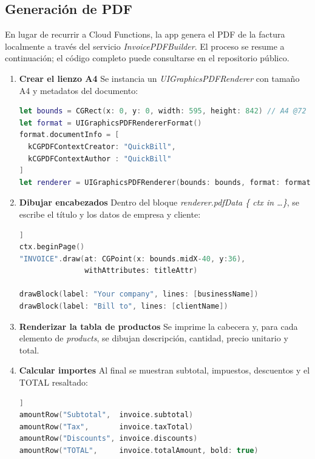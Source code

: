 \subsection{Generación de PDF}

\begin{large}

En lugar de recurrir a Cloud Functions, la app genera el PDF de la factura localmente a través del servicio \textit{InvoicePDFBuilder}. El proceso se resume a continuación; el código completo puede consultarse en el repositorio público.

\begin{enumerate}
  \item \textbf{Crear el lienzo A4}\newline
  Se instancia un \textit{UIGraphicsPDFRenderer} con tamaño A4 y metadatos del documento:
  \begin{lstlisting}[language=swift, basicstyle=\ttfamily\small]
let bounds = CGRect(x: 0, y: 0, width: 595, height: 842) // A4 @72 dpi
let format = UIGraphicsPDFRendererFormat()
format.documentInfo = [
  kCGPDFContextCreator: "QuickBill",
  kCGPDFContextAuthor : "QuickBill"
]
let renderer = UIGraphicsPDFRenderer(bounds: bounds, format: format)
  \end{lstlisting}

  \item \textbf{Dibujar encabezados}\newline
  Dentro del bloque \textit{renderer.pdfData \{ ctx in …\}}, se escribe el título y los datos de empresa y cliente:
  \begin{lstlisting}[language=swift, basicstyle=\ttfamily\small]]
ctx.beginPage()
"INVOICE".draw(at: CGPoint(x: bounds.midX-40, y:36),
               withAttributes: titleAttr)

drawBlock(label: "Your company", lines: [businessName])
drawBlock(label: "Bill to", lines: [clientName])
  \end{lstlisting}

  \item \textbf{Renderizar la tabla de productos}\newline
  Se imprime la cabecera y, para cada elemento de \textit{products}, se dibujan descripción, cantidad, precio unitario y total.

  \item \textbf{Calcular importes}\newline
  Al final se muestran subtotal, impuestos, descuentos y el TOTAL resaltado:
  \begin{lstlisting}[language=swift, basicstyle=\ttfamily\small]]
amountRow("Subtotal",  invoice.subtotal)
amountRow("Tax",       invoice.taxTotal)
amountRow("Discounts", invoice.discounts)
amountRow("TOTAL",     invoice.totalAmount, bold: true)
  \end{lstlisting}


\end{enumerate}
\end{large}
